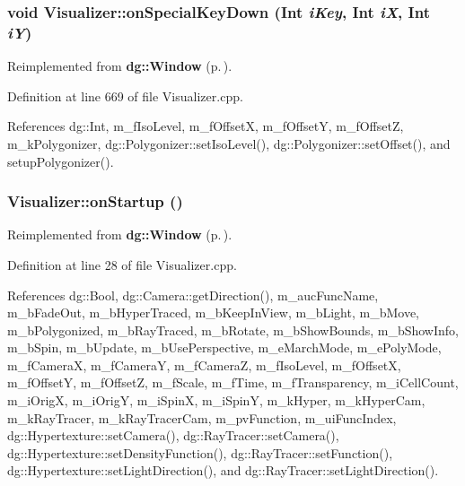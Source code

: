 \subsubsection{\setlength{\rightskip}{0pt plus 5cm}void Visualizer::on\-Special\-Key\-Down ({\bf Int} {\em i\-Key}, {\bf Int} {\em i\-X}, {\bf Int} {\em i\-Y})\hspace{0.3cm}{\tt  [virtual]}}\label{classdg_1_1Visualizer_a8}




Reimplemented from {\bf dg::Window} {\rm (p.\,\pageref{classdg_1_1Window_a12})}.

Definition at line 669 of file Visualizer.cpp.

References dg::Int, m\_\-f\-Iso\-Level, m\_\-f\-Offset\-X, m\_\-f\-Offset\-Y, m\_\-f\-Offset\-Z, m\_\-k\-Polygonizer, dg::Polygonizer::set\-Iso\-Level(), dg::Polygonizer::set\-Offset(), and setup\-Polygonizer().
\subsubsection{ Visualizer::on\-Startup ()\hspace{0.3cm}{\tt  [virtual]}}\label{classdg_1_1Visualizer_a2}




Reimplemented from {\bf dg::Window} {\rm (p.\,\pageref{classdg_1_1Window_a1})}.

Definition at line 28 of file Visualizer.cpp.

References dg::Bool, dg::Camera::get\-Direction(), m\_\-auc\-Func\-Name, m\_\-b\-Fade\-Out, m\_\-b\-Hyper\-Traced, m\_\-b\-Keep\-In\-View, m\_\-b\-Light, m\_\-b\-Move, m\_\-b\-Polygonized, m\_\-b\-Ray\-Traced, m\_\-b\-Rotate, m\_\-b\-Show\-Bounds, m\_\-b\-Show\-Info, m\_\-b\-Spin, m\_\-b\-Update, m\_\-b\-Use\-Perspective, m\_\-e\-March\-Mode, m\_\-e\-Poly\-Mode, m\_\-f\-Camera\-X, m\_\-f\-Camera\-Y, m\_\-f\-Camera\-Z, m\_\-f\-Iso\-Level, m\_\-f\-Offset\-X, m\_\-f\-Offset\-Y, m\_\-f\-Offset\-Z, m\_\-f\-Scale, m\_\-f\-Time, m\_\-f\-Transparency, m\_\-i\-Cell\-Count, m\_\-i\-Orig\-X, m\_\-i\-Orig\-Y, m\_\-i\-Spin\-X, m\_\-i\-Spin\-Y, m\_\-k\-Hyper, m\_\-k\-Hyper\-Cam, m\_\-k\-Ray\-Tracer, m\_\-k\-Ray\-Tracer\-Cam, m\_\-pv\-Function, m\_\-ui\-Func\-Index, dg::Hypertexture::set\-Camera(), dg::Ray\-Tracer::set\-Camera(), dg::Hypertexture::set\-Density\-Function(), dg::Ray\-Tracer::set\-Function(), dg::Hypertexture::set\-Light\-Direction(), and dg::Ray\-Tracer::set\-Light\-Direction().
